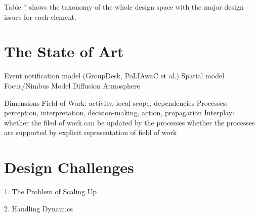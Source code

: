 Table ? shows the taxonomy of the whole design space with the major design issues for each element.


\section{The State of Art} %
\label{sec:the_state_of_art}

Event notification model (GroupDesk, PoLIAwaC et al.)
Spatial model
Focus/Nimbus Model
Diffusion
Atmosphere

Dimensions
Field of Work: activity, local scope, dependencies
Processes: perception, interpretation, decision-making, action, propagation
Interplay: 
whether the filed of work can be updated by the processes
whether the processes are supported by explicit representation of field of work


\section{Design Challenges} %
\label{sec:design_challenges}
1. The Problem of Scaling Up

2. Handling Dynamics









 

